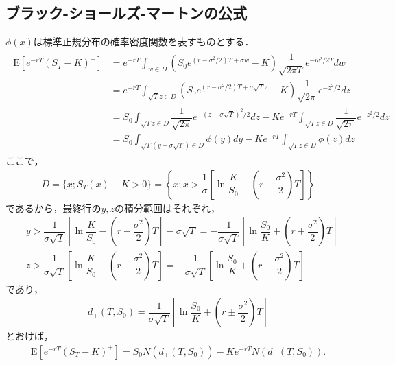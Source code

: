 \documentclass[a4paper,11pt]{jsarticle}
\newcommand{\df}[2]{\dfrac{#1}{#2}}
\newcommand{\E}{\mathrm{E}}
\newcommand{\1}{\mbox{1}\hspace{-0.30em}\mbox{1}}
\begin{document}
\subsection{ブラック-ショールズ-マートンの公式} %
$\phi(x)$は標準正規分布の確率密度関数を表すものとする．
\begin{align*}
  \begin{split}
    \E[e^{-rT}(S_T-K)^+]
    &=e^{-rT}\int_{w\in D} (S_0e^{(r-\sigma^2/2)T+\sigma w}-K)
    \df{1}{\sqrt{2\pi T}}e^{-w^2/2T} dw \\
    &=e^{-rT}\int_{\sqrt{T}z\in D} (S_0e^{(r-\sigma^2/2)T+\sigma \sqrt{T}z}-K)
    \df{1}{\sqrt{2\pi}}e^{-z^2/2} dz \\
    &=S_0 \int_{\sqrt{T}z\in D}
    \df{1}{\sqrt{2\pi}}e^{-(z-\sigma \sqrt{T})^2/2} dz
    -K e^{-rT} \int_{\sqrt{T}z\in D}
    \df{1}{\sqrt{2\pi}}e^{-z^2/2} dz \\
    &=S_0 \int_{\sqrt{T}(y+\sigma\sqrt{T})\in D}\phi(y)dy
    -K e^{-rT} \int_{\sqrt{T}z\in D}\phi(z)dz
  \end{split}
\end{align*}
ここで，
\begin{align*}
  D=\{x;S_T(x)-K>0\}=\left\{x; x>\df{1}{\sigma} \left[\ln{\df{K}{S_0}}
  -\left(r-\df{\sigma^2}{2}\right) T \right] \right\}
\end{align*}
であるから，最終行の$y,z$の積分範囲はそれぞれ，
\begin{align*}
  &y>\df{1}{\sigma\sqrt{T}} \left[\ln{\df{K}{S_0}}
  -\left(r-\df{\sigma^2}{2}\right) T \right] - \sigma\sqrt{T}
  =-\df{1}{\sigma\sqrt{T}} \left[\ln{\df{S_0}{K}}
  +\left(r+\df{\sigma^2}{2}\right) T \right] \\
  & z>\df{1}{\sigma\sqrt{T}} \left[\ln{\df{K}{S_0}}
  -\left(r-\df{\sigma^2}{2}\right) T \right]
  =-\df{1}{\sigma\sqrt{T}} \left[\ln{\df{S_0}{K}}
  +\left(r-\df{\sigma^2}{2}\right) T \right]
\end{align*}
であり，
\begin{align*}
  d_{\pm}(T,S_0)=\df{1}{\sigma\sqrt{T}} \left[\ln{\df{S_0}{K}}
  +\left(r\pm\df{\sigma^2}{2}\right) T \right]
\end{align*}
とおけば，
\begin{align*}
  \E[e^{-rT}(S_T-K)^+]=S_0 N(d_+(T,S_0))
  -K e^{-rT} N(d_-(T,S_0)).
\end{align*}

\subsection{} %
\end{document}
